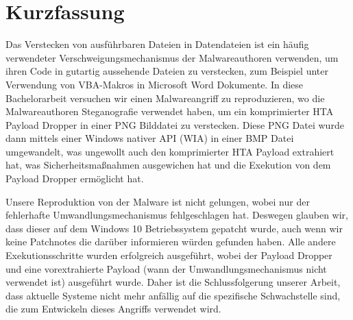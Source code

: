 \chapter{Kurzfassung}
Das Verstecken von ausführbaren Dateien in Datendateien ist ein häufig verwendeter Verschweigungsmechanismus der
Malwareauthoren verwenden, um ihren Code in gutartig aussehende Dateien zu verstecken, zum Beispiel unter Verwendung von
\acrshort{VBA}-Makros in Microsoft Word Dokumente.
In diese Bachelorarbeit versuchen wir einen Malwareangriff zu reproduzieren, wo die Malwareauthoren Steganografie
verwendet haben, um ein komprimierter \acrshort{HTA} Payload Dropper in einer \acrshort{PNG} Bilddatei zu verstecken. Diese
\acrshort{PNG} Datei wurde dann mittels einer Windows nativer \acrshort{API} (\acrshort{WIA}) in einer \acrshort{BMP}
Datei umgewandelt, was ungewollt auch den komprimierter \acrshort{HTA} Payload extrahiert hat, was Sicherheitsmaßnahmen
ausgewichen hat und die Exekution von dem Payload Dropper ermöglicht hat.

Unsere Reproduktion von der Malware ist nicht gelungen, wobei nur der fehlerhafte Umwandlungsmechanismus fehlgeschlagen hat. 
Deswegen glauben wir, dass dieser auf dem Windows 10 Betriebssystem gepatcht wurde, auch wenn wir keine Patchnotes die
darüber informieren würden gefunden haben. Alle andere Exekutionsschritte wurden erfolgreich ausgeführt, wobei der
Payload Dropper und eine vorextrahierte Payload (wann der Umwandlungsmechanismus nicht verwendet ist)
ausgeführt wurde. Daher ist die Schlussfolgerung unserer Arbeit, dass aktuelle Systeme nicht mehr anfällig auf die 
spezifische Schwachstelle sind, die zum Entwickeln dieses Angriffs verwendet wird.
\clearpage
